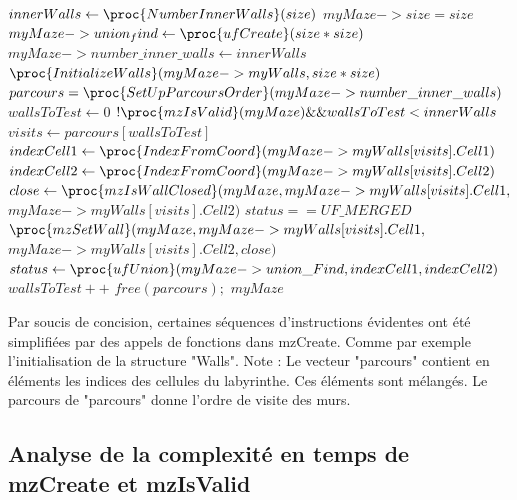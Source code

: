 \documentclass[10pt]{article}
\begin{document}
\begin{codebox}
	\li $innerWalls \gets \proc{NumberInnerWalls}(size)$
	\li $myMaze->size = size$
	\li $myMaze->union_find \gets \proc{ufCreate}(size * size)$
	\li $myMaze->number\_inner\_walls \gets innerWalls$
	\li $\proc{InitializeWalls}(myMaze->myWalls, size*size)$
	\li $parcours = \proc{SetUpParcoursOrder}(myMaze->number\_inner\_walls)$	
	\li $wallsToTest \gets 0$	
	\li \While $!\proc{mzIsValid}(myMaze) \&\& wallsToTest < innerWalls$
	\li $visits \gets parcours[wallsToTest]$
	\li \Do $indexCell1 \gets \proc{IndexFromCoord}(myMaze->myWalls[visits].Cell1)$
	\li 	$indexCell2 \gets \proc{IndexFromCoord}(myMaze->myWalls[visits].Cell2)$
	\li 		$close \gets \proc{mzIsWallClosed}(myMaze, myMaze->myWalls[visits].Cell1,$ \\$myMaze->myWalls[visits].Cell2)$	
	\li 	\If $status == UF\_MERGED$
			\Then	
	\li 	$\proc{mzSetWall}(myMaze, myMaze->myWalls[visits].Cell1,$ \\ $ myMaze->myWalls[visits].Cell2, close)$
	\li 	$status \gets \proc{ufUnion}(myMaze->union\_Find, indexCell1, indexCell2)$
			\End
	\li $wallsToTest++$	
		\End
	\li $free(parcours);$	
	\li \Return $myMaze$
\end{codebox}

Par soucis de concision, certaines séquences d'instructions évidentes ont été simplifiées par des appels de fonctions dans mzCreate. Comme par exemple l'initialisation de la structure "Walls". Note : Le vecteur "parcours" contient en éléments les indices des cellules du labyrinthe. Ces éléments sont mélangés. Le parcours de "parcours" donne l'ordre de visite des murs.

\subsection{Analyse de la complexité en temps de mzCreate et mzIsValid}
\end{document}
